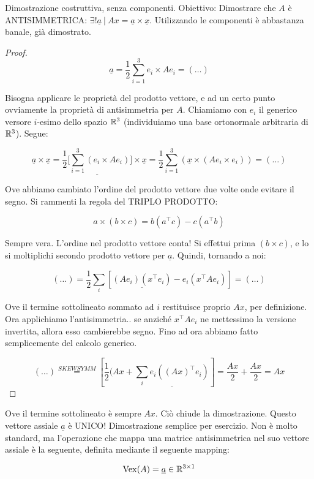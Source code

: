 Dimostrazione costruttiva, senza componenti. Obiettivo: Dimostrare che $A$ è ANTISIMMETRICA: $\exists! \underline{a}\ |\ Ax=\underline{a}\times \underline{x}$. Utilizzando le componenti è abbastanza banale, già dimostrato.

\begin{proof}

\[
	\underline{a} = \frac{1}{2}\sum_{i=1}^3{e_i\times Ae_i} = (\dots)
\]

Bisogna applicare le proprietà del prodotto vettore, e ad un certo punto ovviamente la proprietà di antisimmetria per $A$. Chiamiamo con $e_i$ il generico versore $i$-esimo dello spazio $\mathbb{R}^3$ (individuiamo una base ortonormale arbitraria di $\mathbb{R}^3$). Segue:

\[
	\underline{a}\times\underline{x} = \underline{\frac{1}{2}[\sum_{i=1}^3{(e_i\times Ae_i)]}}\times\underline{x} = \frac{1}{2}\sum_{i=1}^3{(\underline{x}\times(Ae_i\times e_i))} = (\dots)
\]

Ove abbiamo cambiato l'ordine del prodotto vettore due volte onde evitare il segno. Si rammenti la regola del TRIPLO PRODOTTO:

\[
	a\times(b\times c) = b(a^\top c) - c(a^\top b)
\]

Sempre vera. L'ordine nel prodotto vettore conta! Si effettui prima $(b\times c)$, e lo si moltiplichi secondo prodotto vettore per $\underline{a}$. Quindi, tornando a noi:

\[
	(\dots) = \frac{1}{2}\sum_i{[\underline{(Ae_i)(x^\top e_i)} - e_i(x^\top Ae_i)]} = (\dots)
\]

Ove il termine sottolineato sommato ad $i$ restituisce proprio $Ax$, per definizione. Ora applichiamo l'antisimmetria.. se anziché $x^\top Ae_i$ ne mettessimo la versione invertita, allora esso cambierebbe segno. Fino ad ora abbiamo fatto semplicemente del calcolo generico.

\[
	(\dots) \stackrel{SKEWSYMM}{=} [\frac{1}{2}(Ax + \underline{\sum_i{e_i((Ax)^\top e_i)}}] = \frac{Ax}{2}+\frac{Ax}{2} = Ax
\]

\end{proof}

Ove il termine sottolineato è sempre $Ax$. Ciò chiude la dimostrazione. Questo vettore assiale $\underline{a}$ è UNICO! Dimostrazione semplice per esercizio. Non è molto standard, ma l'operazione che mappa una matrice antisimmetrica nel suo vettore assiale è la seguente, definita mediante il seguente mapping:

\[
	\operatorname{Vex}(A) = \underline{a}\in\mathbb{R}^{3\times 1}
\]

